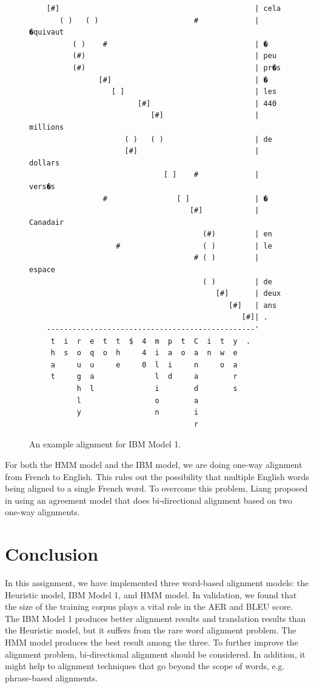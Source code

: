 \documentclass[12pt]{article}   %
\begin{document}
\begin{figure}[h]
\centering
{\tiny
\begin{verbatim}
	[#]                                             | cela
	   ( )   ( )                      #             | �quivaut
	      ( )    #                                  | �
	      (#)                                       | peu
	      (#)                                       | pr�s
	            [#]                                 | �
	               [ ]                              | les
	                     [#]                        | 440
	                        [#]                     | millions
	                  ( )   ( )                     | de
	                  [#]                           | dollars
	                           [ ]    #             | vers�s
	             #                [ ]               | �
	                                 [#]            | Canadair
	                                    (#)         | en
	                #                   ( )         | le
	                                  # ( )         | espace
	                                    ( )         | de
	                                       [#]      | deux
	                                          [#]   | ans
	                                             [#]| .
	------------------------------------------------'
	 t  i  r  e  t  t  $  4  m  p  t  C  i  t  y  . 
	 h  s  o  q  o  h     4  i  a  o  a  n  w  e    
	 a     u  u     e     0  l  i     n     o  a    
	 t     g  a              l  d     a        r    
	       h  l              i        d        s    
	       l                 o        a             
	       y                 n        i             
	                                  r
\end{verbatim}
}
\label{fig:model1align}
\caption{An example alignment for IBM Model 1.}
\end{figure}

For both the HMM model and the IBM model, we are doing one-way alignment from French to English. This rules out the possibility that multiple English words being aligned to a single French word. To overcome this problem, Liang proposed in \cite{align-agreement} using an agreement model that does bi-directional alignment based on two one-way alignments. 


\section{Conclusion}
In this assignment, we have implemented three word-based alignment models: the Heuristic model, IBM Model 1, and HMM model. In validation, we found that the size of the training corpus plays a vital role in the AER and BLEU score. The IBM Model 1 produces better alignment results and translation results than the Heuristic model, but it suffers from the rare word alignment problem. The HMM model produces the best result among the three. To further improve the alignment problem, bi-directional alignment should be considered. In addition, it might help to alignment techniques that go beyond the scope of words, e.g. phrase-based alignments.




\end{document}
